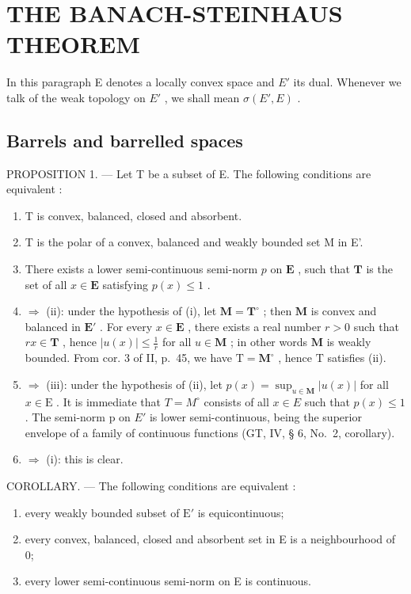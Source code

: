 \section{THE BANACH-STEINHAUS THEOREM}

In this paragraph E denotes a locally convex space and \(E'\) its dual. Whenever we talk of the weak topology on \(E'\) , we shall mean \(\sigma(E', E)\) .

\subsection{Barrels and barrelled spaces}

PROPOSITION 1. --- Let T be a subset of E. The following conditions are equivalent :

\begin{enumerate}
\def\labelenumi{(\roman{enumi})}
\item
  T is convex, balanced, closed and absorbent.
\item
  T is the polar of a convex, balanced and weakly bounded set M in E'.
\item
  There exists a lower semi-continuous semi-norm \(p\) on \(\mathbf{E}\) , such that \(\mathbf{T}\) is the set of all \(x \in \mathbf{E}\) satisfying \(p(x) \leqslant 1\) .
\item
  \(\Rightarrow\) (ii): under the hypothesis of (i), let \(\mathbf{M} = \mathbf{T}^{\circ}\) ; then \(\mathbf{M}\) is convex and balanced in \(\mathbf{E}'\) . For every \(x \in \mathbf{E}\) , there exists a real number \(r > 0\) such that \(rx \in \mathbf{T}\) , hence \(|u(x)| \leqslant \frac{1}{r}\) for all \(u \in \mathbf{M}\) ; in other words \(\mathbf{M}\) is weakly bounded. From cor. 3 of II, p.~45, we have \(\mathrm{T} = \mathbf{M}^{\circ}\) , hence \(\mathrm{T}\) satisfies (ii).
\item
  \(\Rightarrow\) (iii): under the hypothesis of (ii), let \(p(x) = \sup_{u\in \mathbf{M}}|u(x)|\) for all \(x\in \mathrm{E}\) . It is immediate that \(T = M^{\circ}\) consists of all \(x \in E\) such that \(p(x) \leqslant 1\) . The semi-norm p on \(E'\) is lower semi-continuous, being the superior envelope of a family of continuous functions (GT, IV, § 6, No.~2, corollary).
\item
  \(\Rightarrow\) (i): this is clear.
\end{enumerate}

COROLLARY. --- The following conditions are equivalent :

\begin{enumerate}
\def\labelenumi{(\roman{enumi})}
\item
  every weakly bounded subset of \(\mathrm{E}'\) is equicontinuous;
\item
  every convex, balanced, closed and absorbent set in E is a neighbourhood of 0;
\item
  every lower semi-continuous semi-norm on E is continuous.
\end{enumerate}

